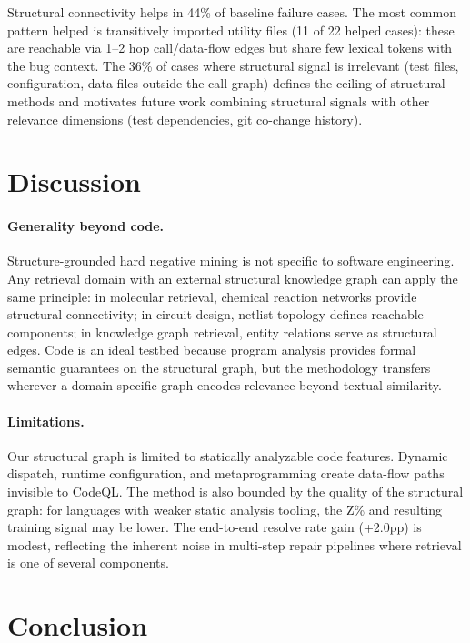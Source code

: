 \documentclass[11pt]{article}
\begin{document}
Structural connectivity helps in 44\% of baseline failure cases.
The most common pattern helped is transitively imported utility files (11 of 22 helped cases): these are reachable via 1--2 hop call/data-flow edges but share few lexical tokens with the bug context.
The 36\% of cases where structural signal is irrelevant (test files, configuration, data files outside the call graph) defines the ceiling of structural methods and motivates future work combining structural signals with other relevance dimensions (test dependencies, git co-change history).

\section{Discussion}
\label{sec:discussion}

\paragraph{Generality beyond code.}
Structure-grounded hard negative mining is not specific to software engineering.
Any retrieval domain with an external structural knowledge graph can apply the same principle: in molecular retrieval, chemical reaction networks provide structural connectivity; in circuit design, netlist topology defines reachable components; in knowledge graph retrieval, entity relations serve as structural edges.
Code is an ideal testbed because program analysis provides formal semantic guarantees on the structural graph, but the methodology transfers wherever a domain-specific graph encodes relevance beyond textual similarity.

\paragraph{Limitations.}
Our structural graph is limited to statically analyzable code features.
Dynamic dispatch, runtime configuration, and metaprogramming create data-flow paths invisible to CodeQL.
The method is also bounded by the quality of the structural graph: for languages with weaker static analysis tooling, the Z\% and resulting training signal may be lower.
The end-to-end resolve rate gain (+2.0pp) is modest, reflecting the inherent noise in multi-step repair pipelines where retrieval is one of several components.

\section{Conclusion}
\label{sec:conclusion}
\end{document}
